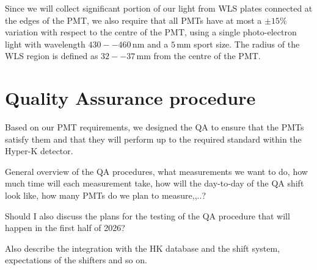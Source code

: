 \documentclass[12pt,a4paper]{article}
\begin{document}
Since we will collect significant portion of our light from WLS plates connected at the edges of the PMT, we also require that all PMTs have at most a $\pm15\%$ variation with respect to the centre of the PMT, using a single photo-electron light with wavelength $430--460\,\text{nm}$ and a $5\,\text{mm}$ sport size. The radius of the WLS region is defined as $32 -- 37\,\text{mm}$ from the centre of the PMT.


\section{Quality Assurance procedure}\label{secQAProcedure}

Based on our PMT requirements, we designed the QA to ensure that the PMTs satisfy them and that they will perform up to the required standard within the Hyper-K detector.

General overview of the QA procedures, what measurements we want to do, how much time will each measurement take, how will the day-to-day of the QA shift look like, how many PMTs do we plan to measure,,..?

Should I also discuss the plans for the testing of the QA procedure that will happen in the first half of 2026?

Also describe the integration with the HK database and the shift system, expectations of the shifters and so on.
\end{document}
